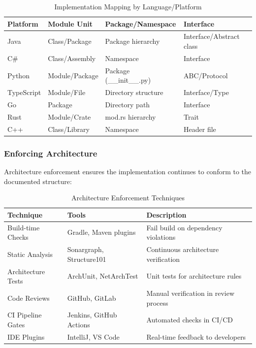 \documentclass[11pt,letterpaper]{article}
\begin{document}
\begin{table}[H]
\centering
\caption{Implementation Mapping by Language/Platform}
\small
\begin{tabular}{@{}L{2.5cm}L{3cm}L{4cm}L{3.5cm}@{}}
\toprule
\textbf{Platform} & \textbf{Module Unit} & \textbf{Package/Namespace} & \textbf{Interface} \\
\midrule
Java & Class/Package & Package hierarchy & Interface/Abstract class \\
C\# & Class/Assembly & Namespace & Interface \\
Python & Module/Package & Package (\_\_init\_\_.py) & ABC/Protocol \\
TypeScript & Module/File & Directory structure & Interface/Type \\
Go & Package & Directory path & Interface \\
Rust & Module/Crate & mod.rs hierarchy & Trait \\
C++ & Class/Library & Namespace & Header file \\
\bottomrule
\end{tabular}
\end{table}

\subsubsection{Enforcing Architecture}

Architecture enforcement ensures the implementation continues to conform to the documented structure:

\begin{table}[H]
\centering
\caption{Architecture Enforcement Techniques}
\small
\begin{tabular}{@{}L{3cm}L{3.5cm}L{6.5cm}@{}}
\toprule
\textbf{Technique} & \textbf{Tools} & \textbf{Description} \\
\midrule
Build-time Checks & Gradle, Maven plugins & Fail build on dependency violations \\
Static Analysis & Sonargraph, Structure101 & Continuous architecture verification \\
Architecture Tests & ArchUnit, NetArchTest & Unit tests for architecture rules \\
Code Reviews & GitHub, GitLab & Manual verification in review process \\
CI Pipeline Gates & Jenkins, GitHub Actions & Automated checks in CI/CD \\
IDE Plugins & IntelliJ, VS Code & Real-time feedback to developers \\
\bottomrule
\end{tabular}
\end{table}
\end{document}
